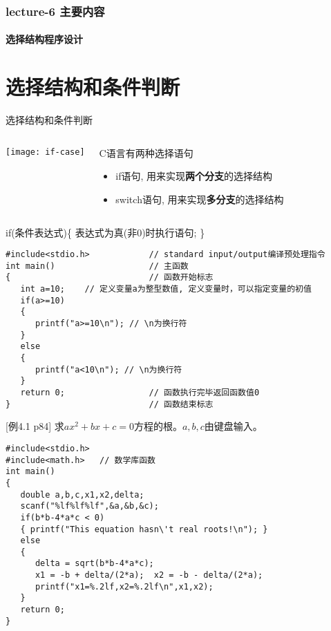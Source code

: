 \begin{frame}[shrink]
  \frametitle{lecture-6 主要内容}
  \framesubtitle{选择结构程序设计}
  \tableofcontents[hideallsubsections]
\end{frame}

\section{选择结构和条件判断}

\begin{frame}{选择结构和条件判断}
\begin{columns}
	\texttt{[image: if-case]}
	\begin{block}{C语言有两种选择语句}
		\begin{itemize}
			\item if语句, 用来实现\textbf{两个分支}的选择结构
			\item switch语句, 用来实现\textbf{多分支}的选择结构
		\end{itemize}
	\end{block}
\end{columns}
\end{frame}

\begin{frame}[fragile]{if(条件表达式)\{ 表达式为真(非0)时执行语句; \}}
\begin{lstlisting}
#include<stdio.h>            // standard input/output编译预处理指令
int main()                   // 主函数
{                            // 函数开始标志
   int a=10;    // 定义变量a为整型数值, 定义变量时，可以指定变量的初值
   if(a>=10)
   {
      printf("a>=10\n"); // \n为换行符
   }
   else
   {
      printf("a<10\n"); // \n为换行符
   }
   return 0;                 // 函数执行完毕返回函数值0
}                            // 函数结束标志
\end{lstlisting}
\end{frame}

\begin{frame}
\small [例4.1 p84] 求$ax^2+bx+c=0$方程的根。$a,b,c$由键盘输入。
\begin{lstlisting}
#include<stdio.h>
#include<math.h>   // 数学库函数        
int main()                   
{  
   double a,b,c,x1,x2,delta;
   scanf("%lf%lf%lf",&a,&b,&c);
   if(b*b-4*a*c < 0) 
   { printf("This equation hasn\'t real roots!\n"); }
   else
   {
      delta = sqrt(b*b-4*a*c);
      x1 = -b + delta/(2*a);  x2 = -b - delta/(2*a);
      printf("x1=%.2lf,x2=%.2lf\n",x1,x2);
   }
   return 0;           
}                            
\end{lstlisting}
\end{frame}

